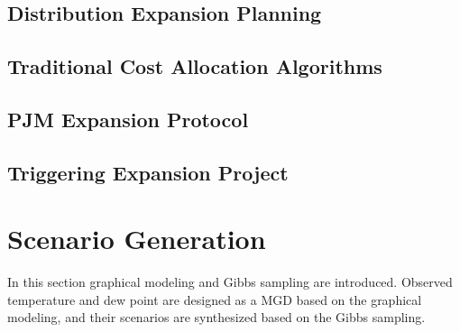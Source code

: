 \documentclass[journal]{IEEEtran} %
\begin{document}
\subsection{Distribution Expansion Planning}






\subsection{Traditional Cost Allocation Algorithms}






\newpage
\subsection{PJM Expansion Protocol}





\subsection{Triggering Expansion Project}


















































\newpage

\section{Scenario Generation}

In this section graphical modeling and Gibbs sampling are introduced. Observed temperature and dew point are designed as a MGD based on the graphical modeling, and their scenarios are synthesized based on the Gibbs sampling.
\end{document}
